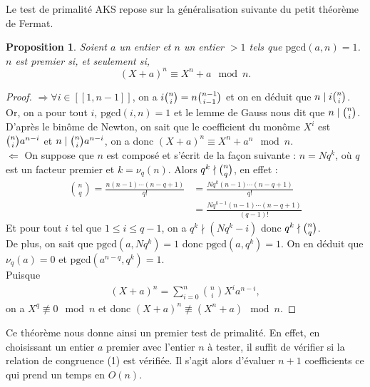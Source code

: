 \documentclass[11pt]{article}
\newtheorem{prop}{Proposition}[subsection]
\newcommand{\pgcd}{\mathrm{pgcd}}
\begin{document}
Le test de primalité \textsc{AKS} repose sur la généralisation suivante du petit théorème de Fermat.

\begin{prop}
Soient $a$ un entier et $n$ un entier $> 1$ tels que $\pgcd(a,n) = 1$.\\
$n$ est premier si, et seulement si,
\begin{equation}
(X+a)^n \equiv X^n + a \mod n.
\end{equation}
\end{prop}

\begin{small}
\begin{proof}
$\Rightarrow \forall i \in [\![1,n-1]\!]$, on a $i \tbinom{n}{i} = n \binom{n-1}{i-1}$ et on en déduit que $n \mid i \tbinom{n}{i}$.\\
Or, on a pour tout $i$, $\pgcd(i,n)=1$ et le lemme de Gauss nous dit que $n \mid \tbinom{n}{i}$. D'après le binôme de Newton, on sait que le coefficient du monôme $X^i$ est $\tbinom{n}{i} a^{n-i}$ et $n \mid \tbinom{n}{i} a^{n-i}$, on a donc $(X+a)^n \equiv X^n + a^n \mod n$.\\

\noindent
$\Leftarrow$ On suppose que $n$ est composé et s'écrit de la façon suivante : $n=N q^k$, où $q$ est un facteur premier et $k=\nu_{q}(n)$. Alors $q^{k} \nmid \tbinom{n}{q}$, en effet :
\begin{align*}
\binom{n}{q}=\frac{n(n-1) \cdots (n-q+1)}{q!}&=\frac{N q^{k} (n-1) \cdots (n-q+1)}{q!}\\
&=\frac{N q^{k-1} (n-1) \cdots (n-q+1)}{(q-1)!}
\end{align*}
Et pour tout $i$ tel que $1 \leqslant i \leqslant q-1$, on a $q^{k} \nmid (N q^{k} - i)$ donc $q^{k} \nmid \tbinom{n}{q}$.\\
De plus, on sait que $\pgcd(a,N q^{k})=1$ donc $\pgcd(a,q^{k})=1$. On en déduit que $\nu_{q}(a)=0$ et $\pgcd(a^{n-q},q^{k})=1$.\\
Puisque
\begin{align*}
(X+a)^n=\sum_{i=0}^n \binom{n}{i} X^i a^{n-i},
\end{align*}
on a $X^q \not\equiv 0 \mod n$ et donc $(X+a)^n \not\equiv (X^n+a) \mod n$.
\end{proof}
\end{small}

Ce théorème nous donne ainsi un premier test de primalité. En effet, en choisissant un entier $a$ premier avec l'entier $n$ à tester, il suffit de vérifier si la relation de congruence (1) est vérifiée. Il s'agit alors d'évaluer $n+1$ coefficients ce qui prend un temps en $O(n)$.\\
\end{document}

